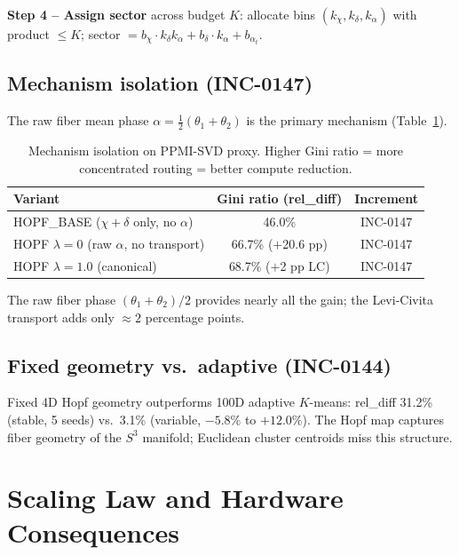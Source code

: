 \documentclass[11pt]{article}
\begin{document}
\textbf{Step 4 -- Assign sector} across budget $K$:
allocate bins $(k_\chi,k_\delta,k_\alpha)$ with product $\le K$; sector $= b_\chi \cdot k_\delta k_\alpha + b_\delta \cdot k_\alpha + b_{\alpha_t}$.

\subsection{Mechanism isolation (INC-0147)}

The raw fiber mean phase $\alpha = \frac{1}{2}(\theta_1+\theta_2)$ is the primary
mechanism (Table~\ref{tab:mechanism}).

\begin{table}[h]
\centering
\caption{Mechanism isolation on PPMI-SVD proxy.
Higher Gini ratio = more concentrated routing = better compute reduction.}
\label{tab:mechanism}
\begin{tabular}{lcc}
\toprule
Variant                                        & Gini ratio (rel\_diff) & Increment \\
\midrule
HOPF\_BASE ($\chi+\delta$ only, no $\alpha$)   & 46.0\%                 & INC-0147  \\
HOPF $\lambda{=}0$ (raw $\alpha$, no transport)& 66.7\% ($+$20.6 pp)    & INC-0147  \\
HOPF $\lambda{=}1.0$ (canonical)               & 68.7\% ($+$2 pp LC)    & INC-0147  \\
\bottomrule
\end{tabular}
\end{table}

The raw fiber phase $(\theta_1+\theta_2)/2$ provides nearly all the gain;
the Levi-Civita transport adds only ${\approx}2$ percentage points.

\subsection{Fixed geometry vs.\ adaptive (INC-0144)}

Fixed 4D Hopf geometry outperforms 100D adaptive $K$-means: rel\_diff 31.2\%
(stable, 5 seeds) vs.\ 3.1\% (variable, $-5.8\%$ to $+12.0\%$).
The Hopf map captures fiber geometry of the $S^3$ manifold; Euclidean cluster
centroids miss this structure.

\section{Scaling Law and Hardware Consequences}
\end{document}

